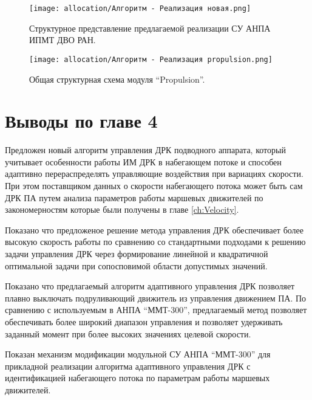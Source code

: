 \begin{figure}[ht]
    \centering
    \texttt{[image: allocation/Алгоритм - Реализация новая.png]}
    \caption{Структурное представление предлагаемой реализации СУ АНПА ИПМТ ДВО РАН.}
    \label{fig:software_new}
\end{figure}

\begin{figure}[ht]
    \centering
    \texttt{[image: allocation/Алгоритм - Реализация propulsion.png]}
    \caption{Общая структурная схема модуля ``Propulsion''.}
    \label{fig:propulsion-diagram}
\end{figure}


\section{Выводы по главе 4}
Предложен новый алгоритм управления ДРК подводного аппарата, который учитывает особенности работы ИМ ДРК в набегающем потоке и способен адаптивно перераспределять управляющие воздействия при вариациях скорости.
При этом поставщиком данных о скорости набегающего потока может быть сам ДРК ПА путем анализа параметров работы маршевых движителей по закономерностям которые были получены в главе \ref{ch:Velocity}.

Показано что предложеное решение метода управления ДРК обеспечивает более высокую скорость работы по сравнению со стандартными подходами к решению задачи управления ДРК через формирование линейной и квадратичной оптимальной задачи при сопосповимой области допустимых значений.

Показано что предлагаемый алгоритм адаптивного управления ДРК позволяет плавно выключать подруливающий движитель из управления движением ПА.
По сравнению с используемым в АНПА ``ММТ-300'', предлагаемый метод позволяет обеспечивать более широкий диапазон управления и позволяет удерживать заданный момент при более высоких значениях целевой скорости.

Показан механизм модификации модульной СУ АНПА ``ММТ-300'' для прикладной реализации алгоритма адаптивного управления ДРК с идентификацией набегающего потока по параметрам работы маршевых движителей.